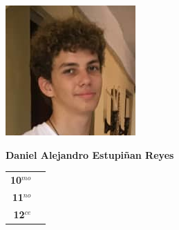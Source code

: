\begin{minipage}{0.2\textwidth}
	\includegraphics[width=\linewidth]{img/concursantes/daniel.png} %
\end{minipage}
\hfill
\begin{minipage}{0.7\textwidth}
	\textbf{Daniel Alejandro Estupiñan Reyes}
	
	\vspace*{0.1in}
	\begin{tabular}{rl}
		
		\textbf{10$^{mo}$} &   \\
		
		\textbf{11$^{no}$} &  \\
		
		\textbf{12$^{ce}$} &   \\
		
		
	\end{tabular}
\end{minipage}

